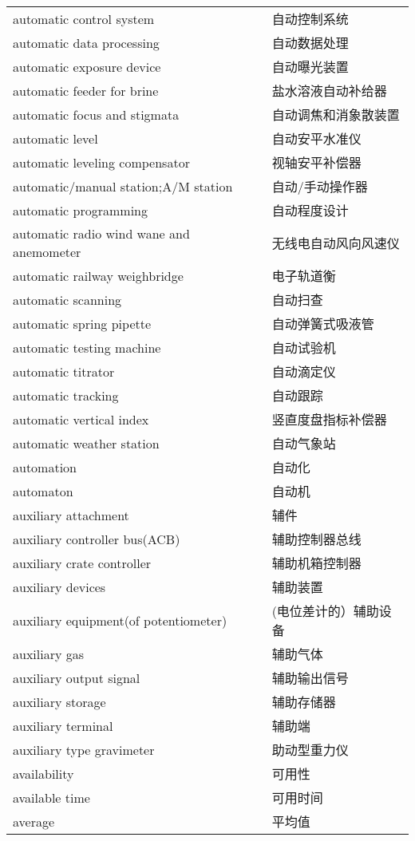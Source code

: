 \documentclass[
]{article}
\begin{document}
\begin{longtable}[]{@{}ll@{}}
automatic control system & 自动控制系统 \\
automatic data processing & 自动数据处理 \\
automatic exposure device & 自动曝光装置 \\
automatic feeder for brine & 盐水溶液自动补给器 \\
automatic focus and stigmata & 自动调焦和消象散装置 \\
automatic level & 自动安平水准仪 \\
automatic leveling compensator & 视轴安平补偿器 \\
automatic/manual station;A/M station & 自动/手动操作器 \\
automatic programming & 自动程度设计 \\
automatic radio wind wane and anemometer & 无线电自动风向风速仪 \\
automatic railway weighbridge & 电子轨道衡 \\
automatic scanning & 自动扫查 \\
automatic spring pipette & 自动弹簧式吸液管 \\
automatic testing machine & 自动试验机 \\
automatic titrator & 自动滴定仪 \\
automatic tracking & 自动跟踪 \\
automatic vertical index & 竖直度盘指标补偿器 \\
automatic weather station & 自动气象站 \\
automation & 自动化 \\
automaton & 自动机 \\
auxiliary attachment & 辅件 \\
auxiliary controller bus(ACB) & 辅助控制器总线 \\
auxiliary crate controller & 辅助机箱控制器 \\
auxiliary devices & 辅助装置 \\
auxiliary equipment(of potentiometer) & (电位差计的）辅助设备 \\
auxiliary gas & 辅助气体 \\
auxiliary output signal & 辅助输出信号 \\
auxiliary storage & 辅助存储器 \\
auxiliary terminal & 辅助端 \\
auxiliary type gravimeter & 助动型重力仪 \\
availability & 可用性 \\
available time & 可用时间 \\
average & 平均值 \\

\end{longtable}
\end{document}
